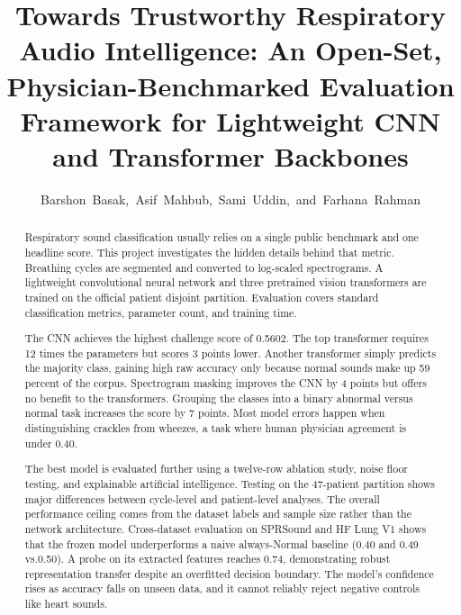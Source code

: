 \documentclass[journal,onecolumn]{IEEEtran}
\newif\ifshownew
\newcommand{\added}[1]{\ifshownew\ul{#1}\else#1\fi}
\begin{document}
\title{Towards Trustworthy Respiratory Audio Intelligence: An Open-Set, Physician-Benchmarked Evaluation Framework for Lightweight CNN and Transformer Backbones}

\author{Barshon~Basak,~Asif~Mahbub,~Sami~Uddin,~and~Farhana~Rahman}

\maketitle

\begin{abstract}
Respiratory sound classification usually relies on a single public benchmark and one headline score. This project investigates the hidden details behind that metric. Breathing cycles are segmented and converted to log-scaled spectrograms. A lightweight convolutional neural network and three pretrained vision transformers are trained on the official patient disjoint partition. Evaluation covers standard classification metrics, parameter count, and training time. 

The CNN achieves the highest challenge score of 0.5602. The top transformer requires 12 times the parameters but scores 3 points lower. Another transformer simply predicts the majority class, gaining high raw accuracy only because normal sounds make up 59 percent of the corpus. Spectrogram masking improves the CNN by 4 points but offers no benefit to the transformers. Grouping the classes into a binary abnormal versus normal task increases the score by 7 points. Most model errors happen when distinguishing crackles from wheezes, a task where human physician agreement is under 0.40.

The best model is evaluated further using a twelve-row ablation study, noise floor testing, and explainable artificial intelligence. Testing on the 47-patient partition shows major differences between cycle-level and patient-level analyses. The overall performance ceiling comes from the dataset labels and sample size rather than the network architecture. \added{Cross-dataset evaluation on SPRSound and HF Lung V1 shows that the frozen model underperforms a naive always-Normal baseline (0.40 and 0.49 vs.0.50). A probe on its extracted features reaches 0.74, demonstrating robust representation transfer despite an overfitted decision boundary. The model's confidence rises as accuracy falls on unseen data, and it cannot reliably reject negative controls like heart sounds.}
\end{abstract}
\end{document}
